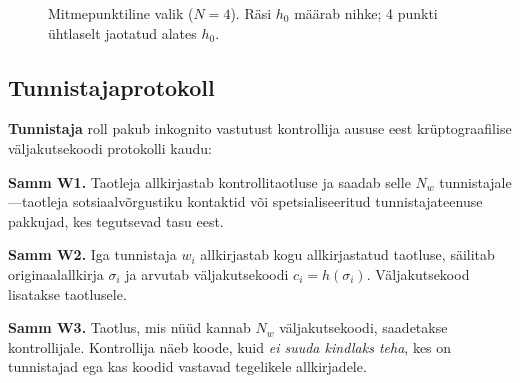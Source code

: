 \documentclass[11pt,a4paper,twocolumn]{article}
\begin{document}
\begin{figure}[ht]
\centering
{}
\caption{Mitmepunktiline valik ($N{=}4$). Räsi $h_0$ määrab nihke; 4 punkti ühtlaselt jaotatud alates $h_0$.}
\label{fig:multipoint}
\end{figure}

\subsection{Tunnistajaprotokoll}

\textbf{Tunnistaja} roll pakub inkognito vastutust kontrollija aususe eest krüptograafilise väljakutsekoodi protokolli kaudu:

\textbf{Samm W1.} Taotleja allkirjastab kontrollitaotluse ja saadab selle $N_w$ tunnistajale---taotleja sotsiaalvõrgustiku kontaktid või spetsialiseeritud tunnistajateenuse pakkujad, kes tegutsevad tasu eest.

\textbf{Samm W2.} Iga tunnistaja $w_i$ allkirjastab kogu allkirjastatud taotluse, säilitab originaalallkirja $\sigma_i$ ja arvutab väljakutsekoodi $c_i = h(\sigma_i)$. Väljakutsekood lisatakse taotlusele.

\textbf{Samm W3.} Taotlus, mis nüüd kannab $N_w$ väljakutsekoodi, saadetakse kontrollijale. Kontrollija näeb koode, kuid \emph{ei suuda kindlaks teha}, kes on tunnistajad ega kas koodid vastavad tegelikele allkirjadele.
\end{document}
